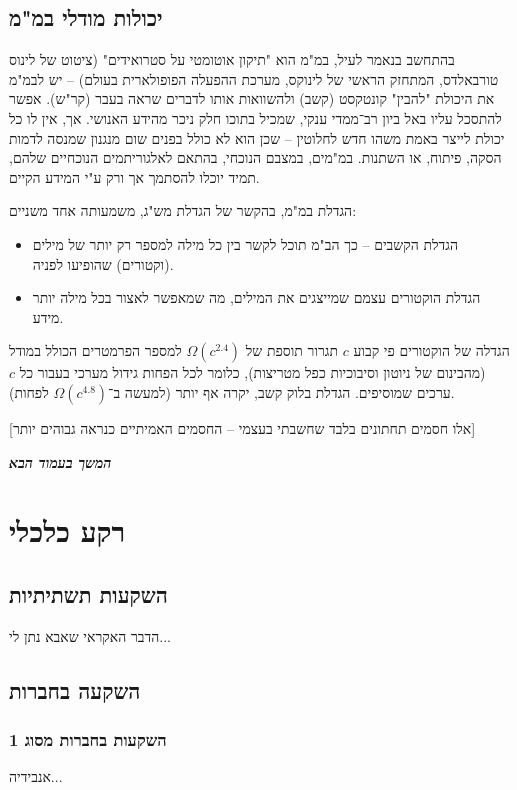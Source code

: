 \documentclass[]{article}
\newcommand\npage {\vfil {\hfil \textbf{\textit{המשך בעמוד הבא}}} \hfil \vfil \pagebreak}
\theoremstyle{definition}
\begin{document}
	
	
	\subsection{יכולות מודלי במ"מ}
	
	בהתחשב בנאמר לעיל, במ"מ הוא "תיקון אוטומטי על סטרואידים" \cite{AutoCorrect} (ציטוט של לינוס טורבאלדס, המתחזק הראשי של לינוקס, מערכת ההפעלה הפופולארית בעולם) – יש לבמ"מ את היכולת "להבין" קונטקסט (קשב) ולהשוואות אותו לדברים שראה בעבר (קר"ש). אפשר להתסכל עליו באל ביון רב־ממדי ענקי, שמכיל בתוכו חלק ניכר מהידע האנושי. אך, אין לו כל יכולת לייצר באמת משהו חדש לחלוטין – שכן הוא לא כולל בפנים שום מנגנון שמנסה לדמות הסקה, פיתוח, או השתנות. במ"מים, במצבם הנוכחי, בהתאם לאלגוריתמים הנוכחיים שלהם, תמיד יוכלו להסתמך אך ורק ע"י המידע הקיים. 
	
	הגדלת במ"מ, בהקשר של הגדלת מש"ג, משמעותה אחד משניים: 
	\begin{itemize}
		\item הגדלת הקשבים – כך הב"מ תוכל לקשר בין כל מילה למספר רק יותר של מילים (וקטורים) שהופיעו לפניה. 
		\item הגדלת הוקטורים עצמם שמייצגים את המילים, מה שמאפשר לאצור בכל מילה יותר מידע. 
	\end{itemize}
	
	הגדלה של הוקטורים פי קבוע $c$ תגרור תוספת של $\Omega(c^{2.4})$ למספר הפרמטרים הכולל במודל (מהבינום של ניוטון וסיבוכיות כפל מטריצות), כלומר לכל הפחות גידול מערכי בעבור כל $c$ ערכים שמוסיפים. הגדלת בלוק קשב, יקרה אף יותר (למעשה ב־$\Omega(c^{4.8})$ לפחות). 
	
	[אלו חסמים תחתונים בלבד שחשבתי בעצמי – החסמים האמיתיים כנראה גבוהים יותר]
	
	\npage
	\section{רקע כלכלי}
	
	\subsection{השקעות תשתיתיות}
	הדבר האקראי שאבא נתן לי...
	
	\subsection{השקעה בחברות}
	
	\subsubsection{השקעות בחברות מסוג 1}
	אנבידיה...
	
\end{document}
